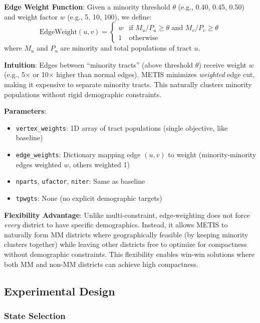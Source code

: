 \textbf{Edge Weight Function}: Given a minority threshold $\theta$ (e.g., 0.40, 0.45, 0.50) and weight factor $w$ (e.g., 5, 10, 100), we define:
\[
\text{EdgeWeight}(u, v) = \begin{cases}
w & \text{if } M_u / P_u \geq \theta \text{ and } M_v / P_v \geq \theta \\
1 & \text{otherwise}
\end{cases}
\]
where $M_u$ and $P_u$ are minority and total populations of tract $u$.

\textbf{Intuition}: Edges between ``minority tracts'' (above threshold $\theta$) receive weight $w$ (e.g., 5$\times$ or 10$\times$ higher than normal edges). METIS minimizes \emph{weighted} edge cut, making it expensive to separate minority tracts. This naturally clusters minority populations without rigid demographic constraints.

\textbf{Parameters}:
\begin{itemize}
    \item \texttt{vertex\_weights}: 1D array of tract populations (single objective, like baseline)
    \item \texttt{edge\_weights}: Dictionary mapping edge $(u,v)$ to weight (minority-minority edges weighted $w$, others weighted 1)
    \item \texttt{nparts}, \texttt{ufactor}, \texttt{niter}: Same as baseline
    \item \texttt{tpwgts}: None (no explicit demographic targets)
\end{itemize}

\textbf{Flexibility Advantage}: Unlike multi-constraint, edge-weighting does not force \emph{every} district to have specific demographics. Instead, it allows METIS to naturally form MM districts where geographically feasible (by keeping minority clusters together) while leaving other districts free to optimize for compactness without demographic constraints. This flexibility enables win-win solutions where both MM and non-MM districts can achieve high compactness.

\subsection{Experimental Design}

\subsubsection{State Selection}

